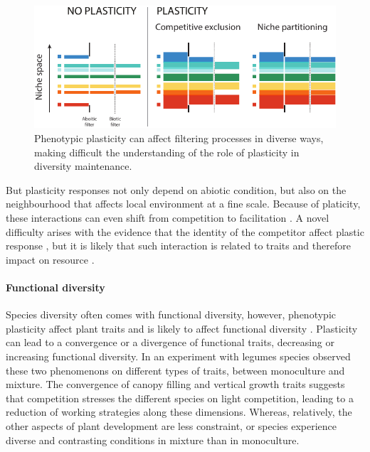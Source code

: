 \begin{figure}
    \includegraphics[width=1\linewidth]{./1_Introduction/graphics/filtering.pdf}
  \caption[Effect of plasticity of filters]{Phenotypic plasticity can affect filtering processes in diverse ways, making difficult the understanding of the role of plasticity in diversity maintenance.}
  \label{fig:plasticity_form}
\end{figure}

But plasticity responses not only depend on abiotic condition, but also on the neighbourhood that affects local environment \parencite{sultan_phenotypic_1995} at a fine scale. Because of platicity, these interactions can even shift from competition to facilitation \cite{callaway_phenotypic_2003}. A novel difficulty arises with the evidence that the identity of the competitor affect plastic response \parencite{callaway_phenotypic_2003, abakumova_plasticity_2016}, but it is likely that such interaction is related to traits and therefore impact on resource \parencite{callaway_phenotypic_2003}.

\paragraph{Functional diversity}

Species diversity often comes with functional diversity, however, phenotypic plasticity affect plant traits and is likely to affect functional diversity \parencite{albert_importance_2012}. Plasticity can lead to a convergence or a divergence of functional traits, decreasing or increasing functional diversity. In an experiment with legumes species \cite{roscher_contrasting_2015} observed these two phenomenons on different types of traits, between monoculture and mixture. The convergence of canopy filling and vertical growth traits suggests that competition stresses the different species on light competition, leading to a reduction of working strategies along these dimensions. Whereas, relatively, the other aspects of plant development are less constraint, or species experience diverse and contrasting conditions in mixture than in monoculture.



